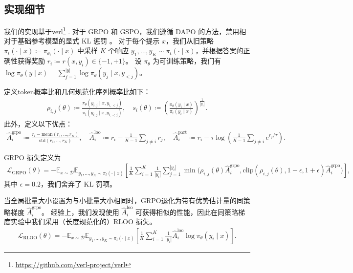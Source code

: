 \documentclass{article}
\theoremstyle{plain}
\theoremstyle{definition}
\theoremstyle{remark}
\newcommand{\abs}[1]{\left|#1\right|}
\begin{document}
\subsection{实现细节}
我们的实现基于verl\footnote{\url{https://github.com/verl-project/verl}} \citep{sheng2025hybridflow}. 
对于 GRPO 和 GSPO，我们遵循 DAPO 的方法，禁用相对于基础参考模型的显式 KL 惩罚 \citep{yu2025dapo}。  
对于每个提示 $x$，我们从旧策略 $\pi_t(\cdot\mid x)\coloneqq\pi_{\theta_t}(\cdot\mid x)$ 中采样 $K$ 个响应 $y_1,\dots,y_K\sim \pi_t(\cdot\mid x)$，并根据答案的正确性获得奖励 $r_i\coloneqq r(x,y_i)\in\{-1,+1\}$。  
设 $\pi_\theta$ 为可训练策略，我们有 $\log \pi_\theta(y\mid x)= \sum_{j=1}^{\abs{y}}\log \pi_\theta(y_j\mid x,y_{<j})$。 

定义token概率比和几何规范化序列概率比如下： 
\begin{align*}
    \rho_{i,j}(\theta)\coloneqq \frac{\pi_\theta(y_{i,j}\mid x,y_{i,<j})}{\pi_t(y_{i,j}\mid x,y_{i,<j})}, 
    \quad
    s_{i}(\theta)\coloneqq \left(\frac{\pi_\theta(y_i\mid x)}{\pi_t(y_i\mid x)}\right)^{\frac{1}{\abs{y_i}}}. 
\end{align*}
此外，定义以下优点： 
\begin{align*}
    \widehat{A}^{\mathrm{grpo}}_i\coloneqq \frac{r_i-\mathrm{mean}(r_1,\dots,r_K)}{\mathrm{std}(r_1,\dots,r_K)}, 
    \quad
    \widehat{A}^{\mathrm{loo}}_i\coloneqq r_i-\frac{1}{K-1}\sum_{j\neq i} r_j,
    \quad
    \widehat{A}^{\mathrm{part}}_i\coloneqq r_i-\tau\log\left(\frac{1}{K-1}\sum_{j\neq i} e^{r_j/\tau}\right).
\end{align*}

GRPO \citep{shao2024deepseekmath} 损失定义为
\begin{align*}
    \mathcal{L}_\mathrm{GRPO}(\theta)=
    -\mathbb{E}_{x\sim \mathcal{D}}\mathbb{E}_{y_1,\dots,y_K\sim\pi_t(\cdot\mid x)}\left[\frac{1}{K}\sum_{i=1}^K\frac{1}{\abs{y_i}}\sum_{j=1}^{\abs{y_i}} \min\Big(\rho_{i,j}(\theta)\widehat{A}^{\mathrm{grpo}}_i, \mathrm{clip}(\rho_{i,j}(\theta),1-\epsilon,1+\epsilon)\widehat{A}^{\mathrm{grpo}}_i\Big)\right],
\end{align*}
其中 $\epsilon=0.2$，我们舍弃了 KL 罚项。 

当全局批量大小设置为与小批量大小相同时，GRPO退化为带有优势估计量的同策略梯度 $\widehat{A}^\mathrm{grpo}_i$。  
经验上，我们发现使用 $\widehat{A}^\mathrm{loo}_i$ 可获得相似的性能，因此在同策略梯度实验中我们采用（长度规范化的）RLOO \citep{ahmadian2024back} 损失。 
\begin{align*}
    \mathcal{L}_{\mathrm{RLOO}}(\theta) = -\mathbb{E}_{x\sim \mathcal{D}}\mathbb{E}_{y_1,\dots,y_K\sim\pi_t(\cdot\mid x)} \left[\frac{1}{K}\sum_{i=1}^K\frac{1}{\abs{y_i}}\widehat{A}^{\mathrm{loo}}_i \log \pi_\theta(y_i\mid x)\right].
\end{align*}
\end{document}
